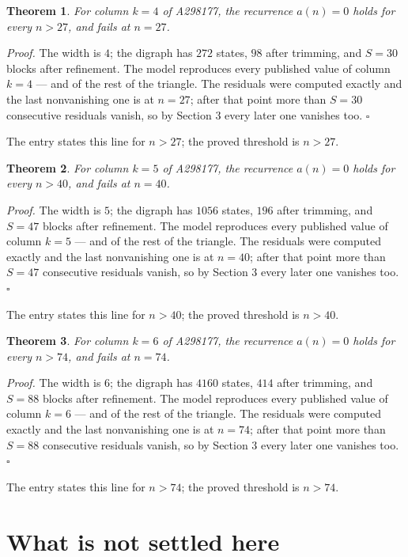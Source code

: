 \documentclass[11pt]{article}
\newtheorem{theorem}{Theorem}
\theoremstyle{definition}
\begin{document}
\begin{theorem} For column $k = 4$ of A298177, the recurrence $a(n) = 0$ holds for every $n > 27$, and fails at $n = 27$.\end{theorem}

{\itshape Proof.} The width is $4$; the digraph has $272$ states, $98$ after trimming, and $S = 30$ blocks after refinement. The model reproduces every published value of column $k = 4$ --- and of the rest of the triangle. The residuals were computed exactly and the last nonvanishing one is at $n = 27$; after that point more than $S = 30$ consecutive residuals vanish, so by Section 3 every later one vanishes too. $\square$

The entry states this line for $n > 27$; the proved threshold is $n > 27$.

\begin{theorem} For column $k = 5$ of A298177, the recurrence $a(n) = 0$ holds for every $n > 40$, and fails at $n = 40$.\end{theorem}

{\itshape Proof.} The width is $5$; the digraph has $1056$ states, $196$ after trimming, and $S = 47$ blocks after refinement. The model reproduces every published value of column $k = 5$ --- and of the rest of the triangle. The residuals were computed exactly and the last nonvanishing one is at $n = 40$; after that point more than $S = 47$ consecutive residuals vanish, so by Section 3 every later one vanishes too. $\square$

The entry states this line for $n > 40$; the proved threshold is $n > 40$.

\begin{theorem} For column $k = 6$ of A298177, the recurrence $a(n) = 0$ holds for every $n > 74$, and fails at $n = 74$.\end{theorem}

{\itshape Proof.} The width is $6$; the digraph has $4160$ states, $414$ after trimming, and $S = 88$ blocks after refinement. The model reproduces every published value of column $k = 6$ --- and of the rest of the triangle. The residuals were computed exactly and the last nonvanishing one is at $n = 74$; after that point more than $S = 88$ consecutive residuals vanish, so by Section 3 every later one vanishes too. $\square$

The entry states this line for $n > 74$; the proved threshold is $n > 74$.

\section{What is not settled here}
\end{document}
